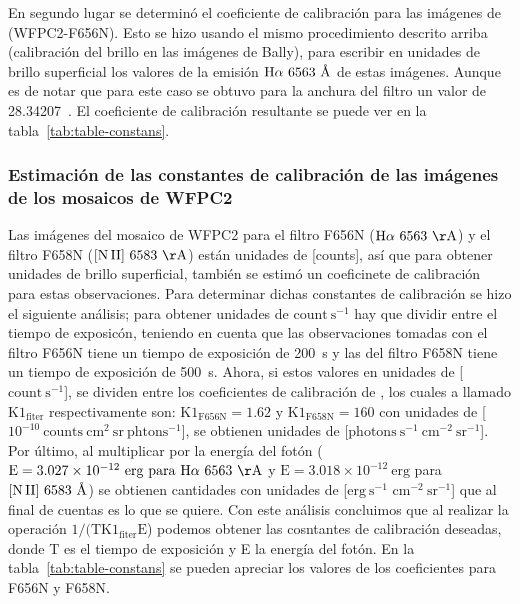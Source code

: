 En segundo lugar se determinó el coeficiente de calibración  para las imágenes de \citet{Robberto:2013a} (WFPC2-F656N). Esto se hizo usando el mismo procedimiento descrito arriba (calibración del brillo en las imágenes de Bally), para escribir en unidades de brillo superficial los valores de la emisión \(\mathrm{H}\alpha{}~6563~\text{\AA{}}{}\) de estas imágenes. Aunque es de notar que para este caso se obtuvo para la anchura del filtro un valor de 28.34207~\A{}. El coeficiente de calibración resultante se puede ver en la tabla~\ref{tab:table-constans}.\\

\subsubsection{Estimación de las  constantes de calibración de las imágenes de los mosaicos de WFPC2}
\label{sec:wpfc2}
Las imágenes del mosaico de WFPC2 para el filtro F656N (\(\mathrm{\ha~6563~\AA{}}\)) y el filtro F658N (\(\mathrm{\nii~6583~\AA{}}\)) están unidades de [counts], así que para obtener unidades de brillo superficial, también se estimó un coeficinete de calibración para estas observaciones. Para determinar dichas constantes de calibración se hizo el siguiente análisis; para obtener unidades de \(\mathrm{count~s^{-1}}\) hay que  dividir entre el tiempo de exposicón, teniendo en cuenta que las observaciones tomadas con el filtro F656N tiene un tiempo de exposición de 200~s y las del filtro F658N tiene un tiempo de exposición de 500~s. Ahora, si estos valores en unidades de [\(\mathrm{count~s^{-1}}\)], se dividen entre los coeficientes de calibración de \citet{Odell:2009}, los cuales a llamado \(\mathrm{K1_{fiter}}\) respectivamente son: \(\mathrm{K1_{F656N} = 1.62}\) y \(\mathrm{K1_{F658N} = 160}\) con unidades de [\(\mathrm{10^{-10}~counts~cm^{2}~sr~phtons^{-1}}\)], se obtienen unidades de [\(\mathrm{photons~s^{-1}~cm^{-2}~sr^{-1}}\)]. Por último, al multiplicar por la energía del fotón (\(\mathrm{E=3.027\times 10^{-12}~erg~para~\ha{}~6563~\AA{}}\) y \(\mathrm{E=3.018 \times10^{-12}~erg}\) para \(\mathrm{[N\,II]}{}~6583~\text{\AA{}}{}\)) se obtienen cantidades con unidades de 
[\(\mathrm{erg~s^{-1}}\)  \(\mathrm{cm^{-2}~sr^{-1}}\)] que al final de cuentas es lo que se quiere.  Con este análisis concluimos que al realizar la operación \(1/(\mathrm{TK1_{fiter}E}\))  podemos obtener las cosntantes de calibración deseadas, donde T es el tiempo de exposición y E la energía del fotón. En la tabla~\ref{tab:table-constans} se pueden apreciar los valores de los coeficientes para F656N y F658N. 


